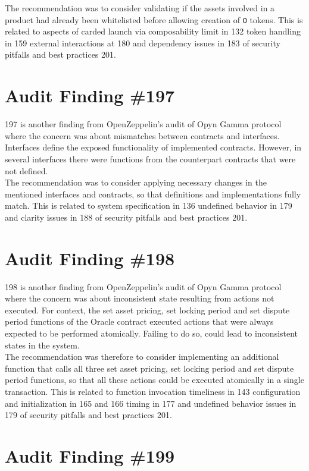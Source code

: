 The recommendation was to consider validating if the assets involved in a product had already been whitelisted before allowing creation of \verb|O| tokens. This is related to aspects of carded launch via composability limit in 132 token handling in 159 external interactions at 180 and dependency issues in 183 of security pitfalls and best practices 201.

\section{Audit Finding \#197}

197 is another finding from OpenZeppelin's audit of Opyn Gamma protocol where the concern was about mismatches between contracts and interfaces. Interfaces define the exposed functionality of implemented contracts. However, in several interfaces there were functions from the counterpart contracts that were not defined.\\

The recommendation was to consider applying necessary changes in the mentioned interfaces and contracts, so that definitions and implementations fully match. This is related to system specification in 136 undefined behavior in 179 and clarity issues in 188 of security pitfalls and best practices 201.

\section{Audit Finding \#198}

198 is another finding from OpenZeppelin's audit of Opyn Gamma protocol where the concern was about inconsistent state resulting from actions not executed. For context, the set asset pricing, set locking period and set dispute period functions of the Oracle contract executed actions that were always expected to be performed atomically. Failing to do so, could lead to inconsistent states in the system.\\

The recommendation was therefore to consider implementing an additional function that calls all three set asset pricing, set locking period and set dispute period functions, so that all these actions could be executed atomically in a single transaction. This is related to function invocation timeliness in 143 configuration and initialization in 165 and 166 timing in 177 and undefined behavior issues in 179 of security pitfalls and best practices 201.

\section{Audit Finding \#199}


